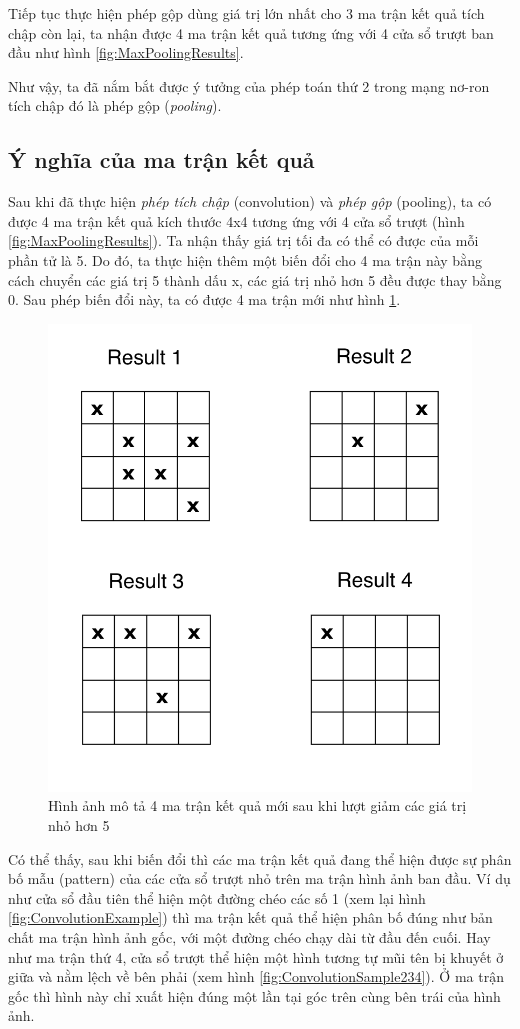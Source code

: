 Tiếp tục thực hiện phép gộp dùng giá trị lớn nhất cho 3 ma trận kết quả tích chập còn lại, ta nhận được 4 ma trận kết quả tương ứng với 4 cửa sổ trượt ban đầu như hình \ref{fig:MaxPoolingResults}.

Như vậy, ta đã nắm bắt được ý tưởng của phép toán thứ 2 trong mạng nơ-ron tích chập đó là phép gộp (\textit{pooling}).

\subsection{Ý nghĩa của ma trận kết quả}
\hspace{\parindent} Sau khi đã thực hiện \textit{phép tích chập} (convolution) và \textit{phép gộp} (pooling), ta có được 4 ma trận kết quả kích thước 4x4 tương ứng với 4 cửa sổ trượt (hình \ref{fig:MaxPoolingResults}). Ta nhận thấy giá trị tối đa có thể có được của mỗi phần tử là 5. Do đó, ta thực hiện thêm một biến đổi cho 4 ma trận này bằng cách chuyển các giá trị 5 thành dấu x, các giá trị nhỏ hơn 5 đều được thay bằng 0. Sau phép biến đổi này, ta có được 4 ma trận mới như hình \ref{fig:CNNResultsMeaning}.

\begin{figure}[!h]
	\centering
		\includegraphics[width=0.6\columnwidth]{chapter05/figure/cnn_results_meaning.png}
		\centering
	\caption{Hình ảnh mô tả 4 ma trận kết quả mới sau khi lượt giảm các giá trị nhỏ hơn 5}
	\label{fig:CNNResultsMeaning}
\end{figure}

Có thể thấy, sau khi biến đổi thì các ma trận kết quả đang thể hiện được sự phân bố mẫu (pattern) của các cửa sổ trượt nhỏ trên ma trận hình ảnh ban đầu. Ví dụ như cửa sổ đầu tiên thể hiện một đường chéo các số 1 (xem lại hình \ref{fig:ConvolutionExample}) thì ma trận kết quả thể hiện phân bố đúng như bản chất ma trận hình ảnh gốc, với một đường chéo chạy dài từ đầu đến cuối. Hay như ma trận thứ 4, cửa sổ trượt thể hiện một hình tương tự mũi tên bị khuyết ở giữa và nằm lệch về bên phải (xem hình \ref{fig:ConvolutionSample234}). Ở ma trận gốc thì hình này chỉ xuất hiện đúng một lần tại góc trên cùng bên trái của hình ảnh.

